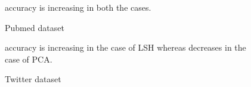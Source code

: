 \documentclass{article}
\begin{document}
\begin{figure}[!htb]%
\centering
    \qquad
    \caption{Pubmed dataset}%
    \label{fig:example}%
   
accuracy is increasing in both the cases.
\end{figure}
\begin{figure}[t!]%
\centering
    \qquad
    \caption{Twitter dataset}%
    \label{fig:example}%
    
    accuracy is increasing in the case of LSH whereas decreases in the case of PCA.
    
\end{figure}
\end{document}
